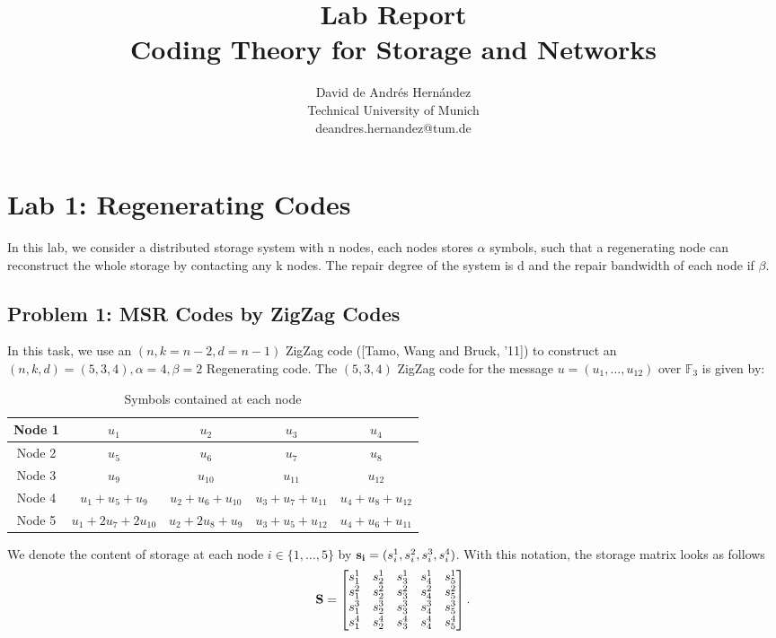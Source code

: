 \documentclass{article}
\title{Lab Report \\[1ex] \large Coding Theory for Storage and Networks}
\author{David de Andrés Hernández\\
\small Technical University of Munich\\
\small deandres.hernandez@tum.de}
\begin{document}
\maketitle


\section*{Lab 1: Regenerating Codes}

In this lab, we consider a distributed storage system with n nodes, each nodes stores $\alpha$ symbols, such that a regenerating node can reconstruct the whole storage by contacting any k nodes. The repair degree of the system is d and the repair bandwidth of each node if $\beta$.

\subsection*{Problem 1: MSR Codes by ZigZag Codes}
In this task, we use an $(n,k = n-2, d=n-1)$ ZigZag code ([Tamo, Wang and Bruck, '11]) to construct an $(n, k, d) = (5,3,4), \alpha =4 , \beta = 2$ Regenerating code. The $(5, 3, 4)$ ZigZag code for the message $u = (u_1,..., u_{12})$ over $\mathbb{F}_3$ is given by:
	
\begin{table}[h!]
\label{tab:ZigZag}
\caption{Symbols contained at each node}
\centering
\begin{tabular}{|c|c|c|c|c|}
\hline
Node 1 & $u_1$ & $u_2$ & $u_3$ & $u_4$  \\
\hline
Node 2 & $u_5$ & $u_6$ & $u_7$ & $u_8$  \\
\hline
Node 3 & $u_9$ & $u_{10}$ & $u_{11}$ & $u_{12}$  \\
\hline
Node 4 & $u_1+u_5+ u_9$ & $u_2+u_6+u_{10}$ & $u_3+u_7+u_{11}$ & $u_4+u_8+u_{12}$  \\
\hline
Node 5 & $u_1+2u_7+ 2u_{10}$ & $u_2+2u_8+u_9$ & $u_3+u_5+u_{12}$ & $u_4+u_6+u_{11}$  \\
\hline
\end{tabular}
\end{table}

\noindent We denote the content of storage at each node $i \in \{1,\ldots, 5\}$ by $\vb{s_i}= (s_i^1, s_i^2, s_i^3, s_i^4)$. With this notation, the storage matrix looks as follows
\begin{equation*}
\vb{S} = 
\begin{bmatrix}
s_1^1 & s_2^1 & s_3^1 & s_4^1 & s_5^1 \\
s_1^2 & s_2^2 & s_3^2 & s_4^2 & s_5^2 \\
s_1^3 & s_2^3 & s_3^3 & s_4^3 & s_5^3 \\
s_1^4 & s_2^4 & s_3^4 & s_4^4 & s_5^4
\end{bmatrix}.
\end{equation*}
\end{document}
